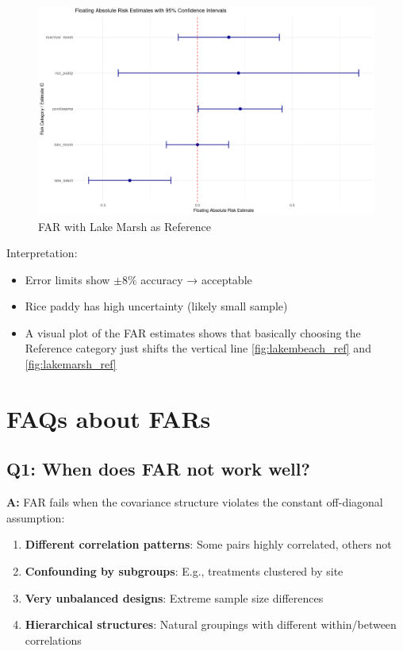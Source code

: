 \documentclass[11pt]{article}
\begin{document}
\begin{figure}
    
    \centering
    \includegraphics[width=0.9\linewidth]{overviews/FAR-clustere-SE/figs/lake_marsh_ref.png}
    \caption{FAR with Lake Marsh as Reference}
    \label{fig:lakemarsh_ref}
\end{figure}

Interpretation:
\begin{itemize}
    \item Error limits show $\pm 8\%$ accuracy → acceptable
    \item Rice paddy has high uncertainty (likely small sample)
    \item A visual plot of the FAR estimates shows that basically choosing the Reference category just shifts the vertical line \autoref{fig:lakembeach_ref} and \autoref{fig:lakemarsh_ref}
\end{itemize}

\section{FAQs about FARs}

\subsection{Q1: When does FAR not work well?}

\textbf{A:} FAR fails when the covariance structure violates the constant off-diagonal assumption:

\begin{enumerate}
    \item \textbf{Different correlation patterns}: Some pairs highly correlated, others not
    \item \textbf{Confounding by subgroups}: E.g., treatments clustered by site
    \item \textbf{Very unbalanced designs}: Extreme sample size differences
    \item \textbf{Hierarchical structures}: Natural groupings with different within/between correlations
\end{enumerate}
\end{document}
